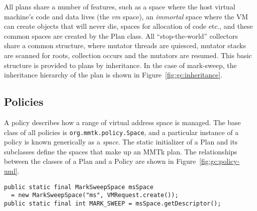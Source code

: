 All \mmtk plans share a number of features, such as a space where the host
virtual machine's code and data lives (the \emph{vm} space), an \emph{immortal}
space where the VM can create objects that will never die, spaces for allocation
of code etc., and these common spaces are created by the Plan class.  All
``stop-the-world'' collectors share a common structure, where mutator threads are quiesced, 
mutator stacks are scanned for roots, collection occurs and the
mutators are resumed.  This basic structure is provided to \mmtk plans by
inheritance.  In the case of mark-sweep, the inheritance hierarchy of the plan
is shown in Figure~\ref{fig:gc:inheritance}.

\begin{sidewaysfigure}
\begin{center}
%
\end{center}
\caption{Inheritance hierarchy of the mark-sweep plan.}
\label{fig:gc:inheritance}
\end{sidewaysfigure}

\subsection{Policies}

\begin{sidewaysfigure}

\caption{Class relations between plans and policies.  The diagram shows a
subset of the relationships, illustrating two spaces: the small code space,
defined in the Plan for all MMTk plans, and the main mark-sweep space.}
\label{fig:gc:policy-uml}
\end{sidewaysfigure}

A policy describes how a range of virtual address space is managed.  
The base class of all policies is \lstinline|org.mmtk.policy.Space|, and a
particular instance of a policy is known generically as a \emph{space}.  
The static initializer of a Plan and its subclasses define the spaces that 
make up an MMTk plan.  The relationships between the classes of a Plan and a
Policy are shown in Figure~{\ref{fig:gc:policy-uml}}.
 
\begin{lstlisting}[name=MS.java,caption=\lstname: definition of the mark-sweep
space, label=fig:gc:ms-space]
public static final MarkSweepSpace msSpace 
  = new MarkSweepSpace("ms", VMRequest.create());
public static final int MARK_SWEEP = msSpace.getDescriptor();
\end{lstlisting}


